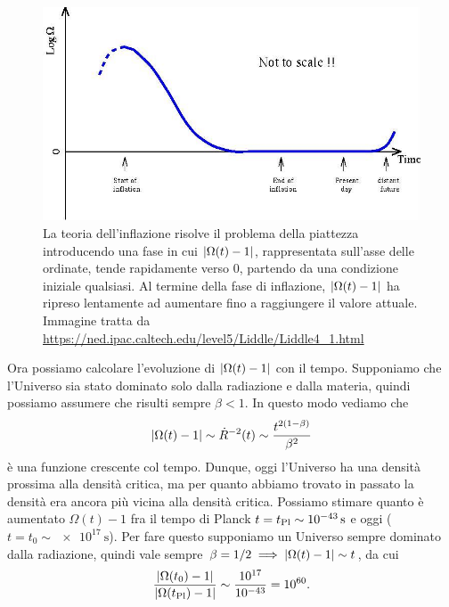 \begin{figure}
  \centering
  \includegraphics[width=\textwidth]{figure/flatness}
  \caption[Come l'inflazione risolve il problema della piattezza]{La teoria
    dell'inflazione risolve il problema della piattezza introducendo una fase in
    cui \(\lvert\Omega(t) - 1\rvert\), rappresentata sull'asse delle ordinate, tende
    rapidamente verso \(0\), partendo da una condizione iniziale qualsiasi.  Al
    termine della fase di inflazione, \(\lvert\Omega(t) - 1\rvert\) ha ripreso
    lentamente ad aumentare fino a raggiungere il valore attuale.  Immagine
    tratta da \url{https://ned.ipac.caltech.edu/level5/Liddle/Liddle4_1.html}}
  \label{fig:piattezza}
\end{figure}
Ora possiamo calcolare l'evoluzione di \(\lvert\Omega(t) - 1\rvert\) con il tempo.
Supponiamo che l'Universo sia stato dominato solo dalla radiazione e dalla
materia, quindi possiamo assumere che risulti sempre \(\beta < 1\).  In questo
modo vediamo che
\begin{equation}
  \label{eq:omega-t}
  \lvert\Omega(t) - 1\rvert \sim \dot{R}^{-2}(t) \sim \frac{t^{2(1-\beta)}}{\beta^{2}}
\end{equation}
è una funzione crescente col tempo.  Dunque, oggi l'Universo ha una densità
prossima alla densità critica, ma per quanto abbiamo trovato in passato la
densità era ancora più vicina alla densità critica.  Possiamo stimare quanto è
aumentato \(\Omega(t) - 1\) fra il tempo di Planck \(t = t_{\textup{Pl}} \sim
\SI{e-43}{\second}\) e oggi (\(t = t_{0} \sim \SI{e17}{\second}\)).  Per fare
questo supponiamo un Universo sempre dominato dalla radiazione, quindi vale
sempre \(\beta = 1/2 \implies \lvert\Omega(t) - 1\rvert \sim t\), da cui
\begin{equation}
  \frac{\lvert\Omega(t_{0}) - 1\rvert}{\lvert\Omega(t_{\textup{Pl}}) - 1\rvert} \sim
  \frac{10^{17}}{10^{-43}} = 10^{60}.
\end{equation}
